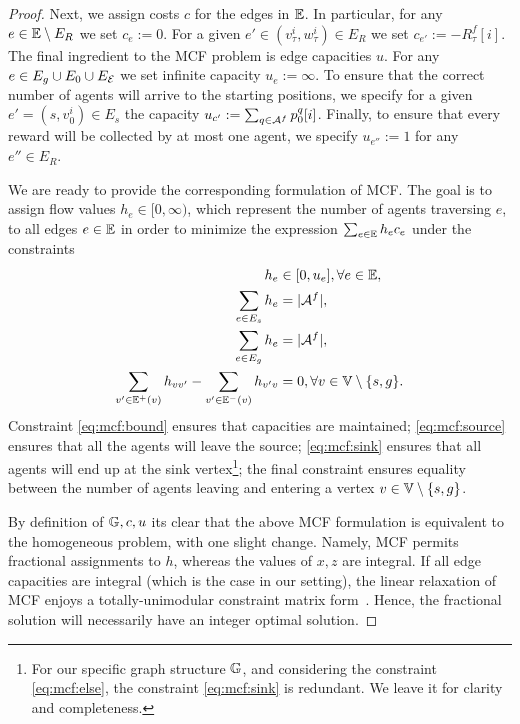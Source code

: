 \documentclass[conference]{IEEEtran}
\begin{document}
\begin{proof}
Next, we assign costs $c$ for the edges in $\mathbb{E}$. In particular, for any $e\in \mathbb{E}\setminus E_R$ we set $c_e:=0$. For a given $e'\in(v^i_\tau,w^i_\tau)\in E_R$ we set $c_{e'}:=-R^f_\tau[i]$. The final ingredient to the MCF problem is edge capacities $u$. For any $e\in E_g\cup E_0\cup E_{\mathcal{E}}$ we set infinite capacity $u_e:=\infty$. To ensure that the correct number of agents will arrive to the starting positions, we specify for a given $e'=(s,v_0^i)\in E_s$ the capacity $u_{c'}:=\sum_{q\in \mathcal{A}^f}p_0^q[i]$. Finally, to ensure that every reward will be collected by at most one agent, we specify $u_{e''}:=1$ for any $e''\in E_R$. 

We are ready to provide the corresponding formulation of MCF. The goal is to assign flow values $h_e\in [0,\infty)$, which represent the number of agents traversing $e$, to all edges $e\in \mathbb{E}$ in order to minimize the expression $\sum_{e\in \mathbb{E}}h_e c_e$ under the constraints 
\begin{subequations}
\begin{align}
 h_{e}&\in [0,u_e],  \forall e\in \mathbb{E},\label{eq:mcf:bound}\\
 \sum_{e\in E_s}h_{e}& =|\mathcal{A}^f|, \label{eq:mcf:source}\\
  \sum_{e\in E_g}h_{e}& =|\mathcal{A}^f|, \label{eq:mcf:sink}\\
  \sum_{v'\in \mathbb{E}^+(v)}h_{vv'}-\sum_{v'\in \mathbb{E}^-(v)}h_{v'v}&= 0, \forall v\in \mathbb{V}\setminus \{s,g\}.\label{eq:mcf:else}
\end{align}
\end{subequations}
Constraint \eqref{eq:mcf:bound} ensures that capacities are maintained; \eqref{eq:mcf:source} ensures that all the agents will leave the source; \eqref{eq:mcf:sink} ensures that all agents will end up at the sink vertex\footnote{For our specific graph structure $\mathbb{G}$, and considering the constraint \eqref{eq:mcf:else}, the constraint \eqref{eq:mcf:sink} is redundant. We leave it for clarity and completeness.}; the final constraint ensures equality between the number of agents leaving and entering a vertex $v\in \mathbb{V}\setminus \{s,g\}$.

By definition of $\mathbb{G},c,u$ its clear that the above MCF formulation is equivalent to the homogeneous problem, with one slight change. Namely, MCF permits fractional assignments to $h$, whereas the values of $x,z$ are integral. If all edge capacities are integral (which is the case in our setting), the linear relaxation of MCF enjoys a totally-unimodular constraint matrix form~\cite{AhujaETAL93}. Hence, the fractional solution will necessarily have an integer optimal solution. 


\end{proof}
\end{document}
